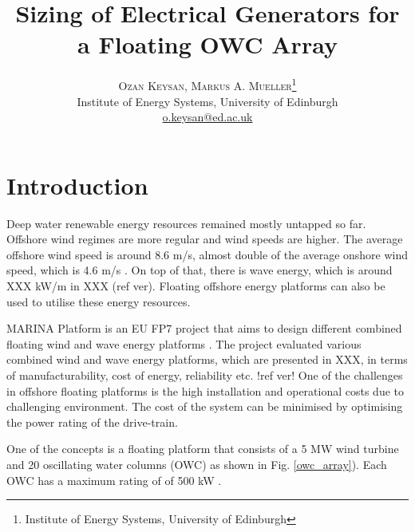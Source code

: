 \documentclass[twocolumn]{article}
\title{\vspace{-15mm}\fontsize{24pt}{10pt}\selectfont\textbf{Sizing of Electrical Generators for a Floating OWC Array}} %
\author{
\large
\textsc{Ozan Keysan, Markus A. Mueller}\thanks{Institute of Energy Systems, University of Edinburgh}\\[2mm] %
\normalsize Institute of Energy Systems, University of Edinburgh \\ %
\normalsize \href{mailto:o.keysan@ed.ac.uk}{o.keysan@ed.ac.uk} %
\vspace{-5mm}
}
\date{}
\begin{document}

\section{Introduction}

Deep water renewable energy resources remained mostly untapped so far. Offshore wind regimes are more regular and wind speeds are higher. The average offshore wind speed is around 8.6 m/s, almost double of the average onshore wind speed, which is 4.6 m/s \cite{Hau2013}. On top of that, there is wave energy, which is around XXX kW/m in XXX (ref ver). Floating offshore energy platforms can also be used to utilise these energy resources.

MARINA Platform is an EU FP7 project that aims to design different combined floating wind and wave energy platforms \cite{marinaweb}. The project evaluated various combined wind and wave energy platforms, which are presented in XXX,  in terms of manufacturability, cost of energy, reliability etc. !ref ver!  One of the challenges in offshore floating platforms is the high installation and operational costs due to challenging environment. The cost of the system can be minimised by optimising the power rating of the drive-train. 

One of the concepts is a floating platform that consists of a 5 MW wind turbine and 20 oscillating water columns (OWC) as shown in Fig. \ref{owc_array}). Each OWC has a maximum rating of of 500 kW \cite{Sullivan2013}.
\end{document}
